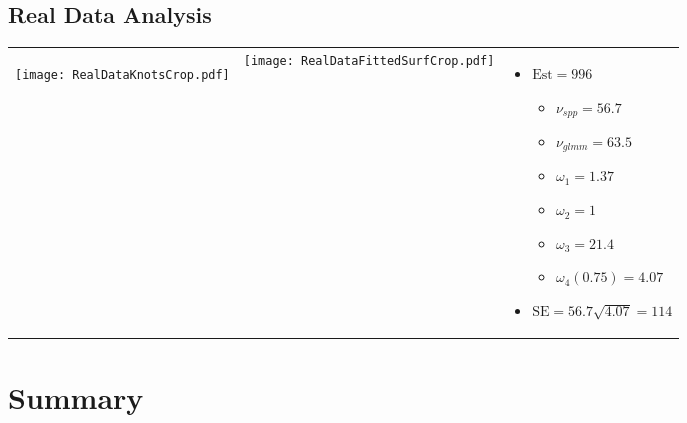 \documentclass[mathserif,compress]{beamer}
\def\bit{\begin{itemize}}
\def\eit{\end{itemize}}
\begin{document}
\subsection{Real Data Analysis}
\begin{frame} 
     
	\begin{tabular} {p{2.5cm} p{2.5cm} p{4.4cm}}
	{
	\begin{center} 
		\vspace{-.1 cm}
		\texttt{[image: RealDataKnotsCrop.pdf]} 
	\end{center}
	} &
	{
		\vspace{.3cm}
		\texttt{[image: RealDataFittedSurfCrop.pdf]} 
	} &
		\vspace{1cm}
		\bit
			\item  $\textrm{Est} = 996$      
				\vspace{0.3cm}  
				\bit
					\item $\nu_{spp} = 56.7$
					\item $\nu_{glmm} = 63.5$
				\eit     
				\vspace{0.3cm}  			
				\bit
					\item $\omega_1 = 1.37$
					\item $\omega_2 = 1$
					\item $\omega_3 = 21.4$
					\item $\omega_4(0.75) = 4.07$
				\eit     
				\vspace{0.3cm} 
			\item $\textrm{SE} = 56.7\sqrt{4.07} = 114$         
		\eit
	\end{tabular}

\end{frame}
    



\section{Summary}
\end{document}
